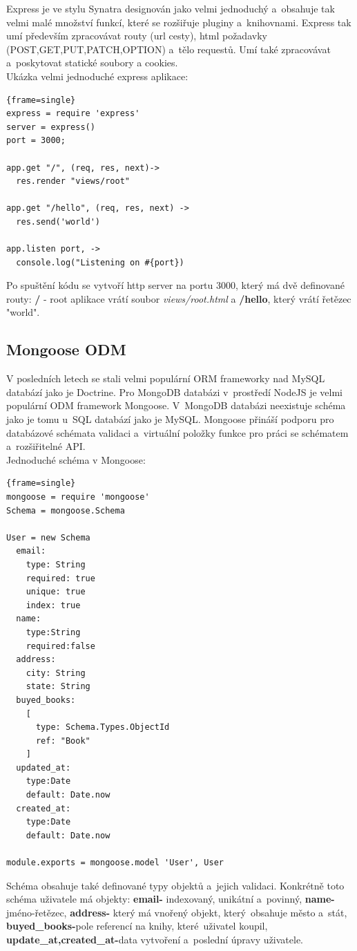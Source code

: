 \documentclass[a4paper,12pt,twoside,BCOR=10mm]{article}
\renewcommand{\b}[1]{\textbf{#1}} %
\renewcommand{\it}[1]{\textit{#1}}    %
\newenvironment{codeframe}{%
  \begin{Sbox} 
    \begin{minipage} 
      {\columnwidth-\leftmargin-\rightmargin-2\fboxsep-2\fboxrule-4pt} 
}{%

  \end{minipage} 
  \end{Sbox} 
  \begin{center} 
    \fcolorbox{black}{codeback}{\TheSbox} 
  \end{center} 
}
\begin{document}
Express je ve stylu Synatra designován jako velmi jednoduchý a~obsahuje tak velmi malé množství funkcí, které se rozšiřuje pluginy a~knihovnami. Express tak umí především zpracovávat routy (url cesty), html požadavky (POST,GET,PUT,PATCH,OPTION) a~tělo requestů. Umí také zpracovávat a~poskytovat statické soubory a cookies.\cite{expressjs}\\
Ukázka velmi jednoduché express aplikace:
     \begin{codeframe} 
      \begin{Verbatim}{frame=single}
express = require 'express'
server = express()
port = 3000;

app.get "/", (req, res, next)->
  res.render "views/root"

app.get "/hello", (req, res, next) ->
  res.send('world')

app.listen port, ->
  console.log("Listening on #{port})
\end{Verbatim} 
    \end{codeframe}
Po spuštění kódu se vytvoří http server na portu 3000, který má dvě definované routy: \b{/} - root aplikace vrátí soubor \it{views/root.html} a \b{/hello}, který vrátí řetězec "world".

\subsection{Mongoose ODM}
V posledních letech se stali velmi populární ORM frameworky nad MySQL databází jako je Doctrine. Pro MongoDB databázi v~prostředí NodeJS je velmi populární ODM framework Mongoose. V~MongoDB databázi neexistuje schéma jako je tomu u~SQL databází jako je MySQL. Mongoose přináší podporu pro databázové schémata validaci a~virtuální položky funkce pro práci se schématem a~rozšiřitelné API. \\

Jednoduché schéma v Mongoose:

     \begin{codeframe} 
      \begin{Verbatim}{frame=single}
mongoose = require 'mongoose'
Schema = mongoose.Schema

User = new Schema
  email:
    type: String
    required: true
    unique: true
    index: true
  name:
    type:String
    required:false
  address:
    city: String
    state: String
  buyed_books:
    [
      type: Schema.Types.ObjectId
      ref: "Book"
    ]
  updated_at:
    type:Date
    default: Date.now
  created_at:
    type:Date
    default: Date.now

module.exports = mongoose.model 'User', User
\end{Verbatim} 
    \end{codeframe}
Schéma obsahuje také definované typy objektů a~jejich validaci. Konkrétně toto schéma uživatele má objekty: \b{email-} indexovaný, unikátní a~povinný, \b{name-} jméno-řetězec, \b{address-} který má vnořený objekt, který~obsahuje město a~stát, \b{buyed\_books-}pole referencí na knihy, které~uživatel koupil, \b{update\_at,created\_at-}data vytvoření a~poslední úpravy uživatele.
\end{document}
